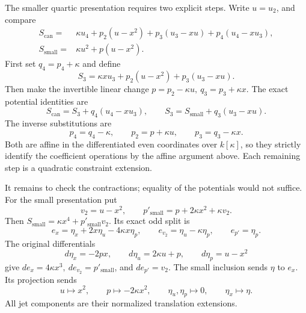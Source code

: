 The smaller quartic presentation requires two explicit steps.
Write \(u=u_2\), and compare
\begin{equation}\label{cp:eq:quartic-presentations}
 \begin{split}
 S_{\mathrm{can}}={}&\kappa u_4+
 p_2(u-x^2)+p_3(u_3-xu)+p_4(u_4-xu_3),\\
 S_{\mathrm{small}}={}&\kappa u^2+p(u-x^2).
 \end{split}
\end{equation}
First set \(q_4=p_4+\kappa\) and define
\[
 S_3=\kappa xu_3+p_2(u-x^2)+p_3(u_3-xu).
\]
Then make the invertible linear change
\(p=p_2-\kappa u,\ q_3=p_3+\kappa x\).
The exact potential identities are
\begin{equation}\label{cp:eq:quartic-steps}
 S_{\mathrm{can}}=S_3+q_4(u_4-xu_3),
 \qquad
 S_3=S_{\mathrm{small}}+q_3(u_3-xu).
\end{equation}
The inverse substitutions are
\[
 p_4=q_4-\kappa,\qquad
 p_2=p+\kappa u,\qquad p_3=q_3-\kappa x.
\]
Both are affine in the differentiated even coordinates over
\(k[\kappa]\), so they strictly identify the coefficient operations
by the affine argument above.  Each remaining step is a quadratic
constraint extension.

It remains to check the contractions; equality of the potentials
would not suffice.  For the small presentation put
\[
 v_2=u-x^2,\qquad
 p'_{\mathrm{small}}=p+2\kappa x^2+\kappa v_2.
\]
Then \(S_{\mathrm{small}}=\kappa x^4+p'_{\mathrm{small}}v_2\).
Its exact odd split is
\begin{equation}\label{cp:eq:small-odd}
 e_x=\eta_x+2x\eta_u-4\kappa x\eta_p,\qquad
 e_{v_2}=\eta_u-\kappa\eta_p,\qquad e_{p'}=\eta_p.
\end{equation}
The original differentials
\[
 d\eta_x=-2px,\qquad d\eta_u=2\kappa u+p,\qquad
 d\eta_p=u-x^2
\]
give \(de_x=4\kappa x^3,\ de_{v_2}=p'_{\mathrm{small}}\),
and \(de_{p'}=v_2\).  The small inclusion sends \(\eta\) to
\(e_x\).  Its projection sends
\[
 u\mapsto x^2,\qquad p\mapsto-2\kappa x^2,\qquad
 \eta_u,\eta_p\mapsto0,\qquad \eta_x\mapsto\eta.
\]
All jet components are their normalized translation extensions.

